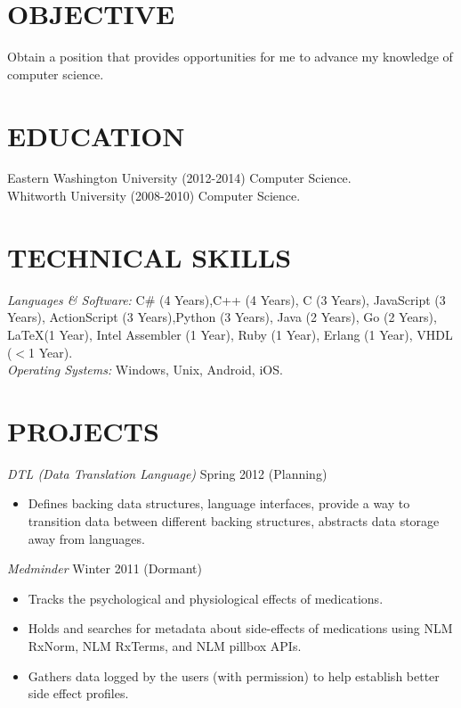 \documentclass[line]{res}
\begin{document}

\address{509-699-1184 $|$ ericfode@gmail.com}

 
\begin{resume}
 
\section{OBJECTIVE} Obtain a position that provides opportunities for me to advance my knowledge of computer science.

\section{EDUCATION}	Eastern Washington University (2012-2014) Computer Science.\\
					Whitworth University (2008-2010) Computer Science.
					
 
 
\section{TECHNICAL SKILLS} {\sl Languages \& Software:} C\# (4 Years),C++ (4 Years), C (3 Years), JavaScript (3 Years), ActionScript (3 Years),Python (3 Years), Java (2 Years), Go (2 Years), \LaTeX (1 Year), Intel Assembler (1 Year), Ruby (1 Year), Erlang (1 Year), VHDL ($<$1 Year).\\
{\sl Operating Systems:} Windows, Unix, Android, iOS.

                
\section{PROJECTS} 
				{\sl DTL (Data Translation Language)} \hfill Spring 2012 (Planning)
                 \begin{itemize}  \itemsep -2pt %
                 	\item Defines backing data structures, language interfaces, provide a way to transition data between different backing structures, abstracts data storage away from languages.
				 \end{itemize}
				{\sl Medminder} \hfill Winter 2011 (Dormant)
                 \begin{itemize}  \itemsep -2pt %
                	\item Tracks the psychological and physiological effects of medications.
                	\item Holds and searches for metadata about side-effects of medications using NLM RxNorm, NLM RxTerms, and NLM pillbox APIs.
                	\item Gathers data logged by the users (with permission) to help establish better side effect profiles.
                \end{itemize}

\end{resume}
\end{document}
